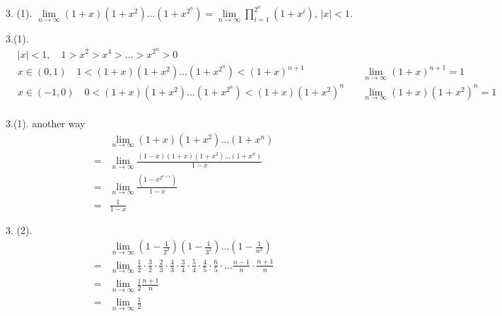 3. (1).
$ \lim\limits_{n\rightarrow\infty}(1+x)(1+x^2)\dots(1+x^{2^n}) = \lim\limits_{n\rightarrow\infty}\prod_{i=1}^{2^n}(1+x^i) $, $ |x| <1 $.
\begin{solve*}3.(1).
	\begin{align*}
		&|x|<1,\quad 1>x^2>x^4>\dots>x^{2^n}>0&\\
		&x\in(0,1)\quad 1<(1+x)(1+x^2)\dots(1+x^{2^n})<(1+x)^{n+1}\quad &\lim_{n\rightarrow\infty}(1+x)^{n+1}=1\\
		&x\in(-1,0)\quad 0<(1+x)(1+x^2)\dots(1+x^{2^n})<(1+x)(1+x^2)^{n}\quad &\lim_{n\rightarrow\infty}(1+x)(1+x^2)^{n}=1\\
	\end{align*}
\end{solve*}
\begin{solve*}3.(1). another way
	\begin{align*}
		 &\lim_{n\rightarrow\infty} (1+x)(1+x^2)\dots(1+x^n)\\
		=&\lim_{n\rightarrow\infty} \frac{(1-x)(1+x)(1+x^2)\dots(1+x^n)}{1-x}\\
		=&\lim_{n\rightarrow\infty} \frac{(1-x^{2^{n+1}})}{1-x}\\
		=&\frac{1}{1-x}
	\end{align*}
\end{solve*}


\begin{solve*}3. (2).
	\begin{align*}
		&\lim_{n\rightarrow\infty}(1-\frac{1}{2^2})(1-\frac{1}{3^2})\dots(1-\frac{1}{n^2})\\
		=&\lim_{n\rightarrow\infty}
		 \frac{1}{2}\cdot\frac{3}{2}\cdot
		 \frac{2}{3}\cdot\frac{4}{3}\cdot
		 \frac{3}{4}\cdot\frac{5}{4}\cdot
		 \frac{4}{5}\cdot\frac{6}{5}\cdot
		 \dots
		 \frac{n-1}{n}\cdot\frac{n+1}{n}\\
		=&\lim_{n\rightarrow\infty}\frac{1}{2}\frac{n+1}{n}\\
		=&\lim_{n\rightarrow\infty}\frac{1}{2}		 
	\end{align*}
\end{solve*}

